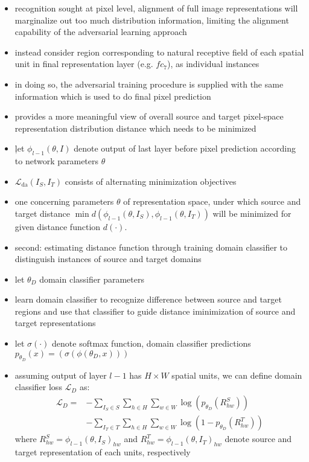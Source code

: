 \begin{itemize}
	\item recognition sought at pixel level, alignment of full image representations will marginalize out too much distribution information, limiting the alignment capability of the adversarial learning approach
	\item instead consider region corresponding to natural receptive field of each spatial unit in final representation layer (e.g. $fc_7$), as individual instances
	\item in doing so, the adversarial training procedure is supplied with the same information which is used to do final pixel prediction
	\item provides a more meaningful view of overall source and target pixel-space representation distribution distance which needs to be minimized
	\item ļet $\phi_{l-1}(\theta, I)$ denote output of last layer before pixel prediction according to network parameters $\theta$
	\item $\mathcal{L}_{\text{da}}(I_S, I_T)$ consists of alternating minimization objectives
	\item one concerning parameters $\theta$ of representation space, under which source and target distance $\min d(\phi_{l-1}(\theta, I_S), \phi_{l-1}(\theta, I_T))$ will be minimized for given distance function $d(\cdot)$.
	\item second: estimating distance function through training domain classifier to distinguish instances of source and target domains
	\item let $\theta_D$ domain classifier parameters
	\item learn domain classifier to recognize difference between source and target regions and use that classifier to guide distance iminimization of source and target representations
	\item let $\sigma (\cdot)$ denote softmax function, domain classifier predictions $p_{\theta_D}(x) = (\sigma(\phi(\theta_{D}, x)))$
	\item assuming output of layer $l-1$ has $H \times W$ spatial units, we can define domain classifier loss $\mathcal{L}_D$ as:
	\begin{align}
		\mathcal{L}_D = &- \sum_{I_S \in S} \sum_{h\in H}\sum_{w \in W} \log ( p_{\theta_D}(R^S_{hw}))\\
		&- \sum_{I_T \in T} \sum_{h\in H}\sum_{w \in W} \log (1 - p_{\theta_D}(R^T_{hw}))
	\end{align}
	where $R^S_{hw} = \phi_{l-1}(\theta, I_S)_{hw}$ and $R^T_{hw} = \phi_{l-1}(\theta, I_T)_{hw}$ denote source and target representation of each units, respectively

\end{itemize}
